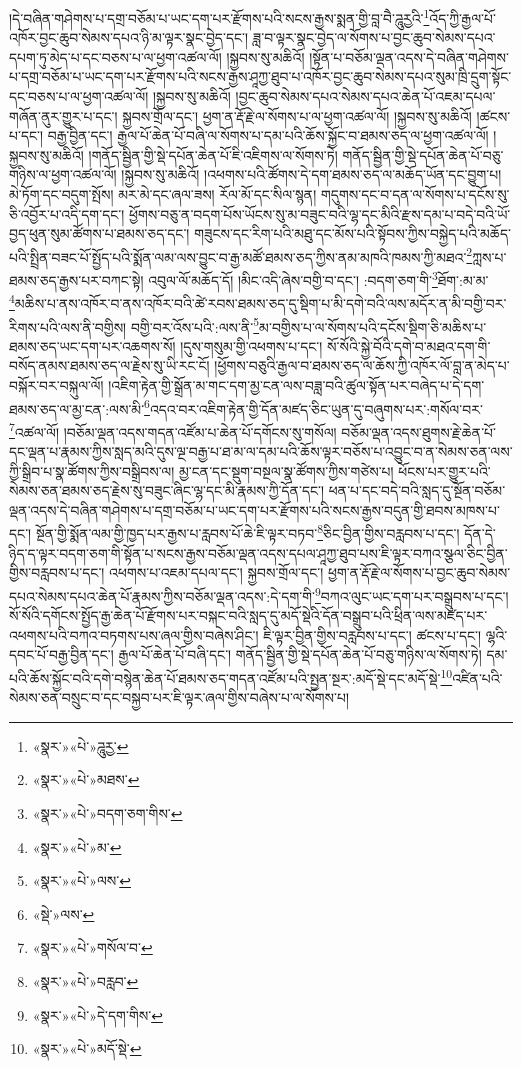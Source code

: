 །དེ་བཞིན་གཤེགས་པ་དགྲ་བཅོམ་པ་ཡང་དག་པར་རྫོགས་པའི་སངས་རྒྱས་སྨན་གྱི་བླ་བཻ་ཌཱུརྱའི་\footnote{«སྣར་»«པེ་»ཌཱུརྱ་}འོད་ཀྱི་རྒྱལ་པོ་འཁོར་བྱང་ཆུབ་སེམས་དཔའ་ཉི་མ་ལྟར་སྣང་བྱེད་དང་། ཟླ་བ་ལྟར་སྣང་བྱེད་ལ་སོགས་པ་བྱང་ཆུབ་སེམས་དཔའ་དཔག་ཏུ་མེད་པ་དང་བཅས་པ་ལ་ཕྱག་འཚལ་ལོ། །སྐྱབས་སུ་མཆིའོ། །སྟོན་པ་བཅོམ་ལྡན་འདས་དེ་བཞིན་གཤེགས་པ་དགྲ་བཅོམ་པ་ཡང་དག་པར་རྫོགས་པའི་སངས་རྒྱས་ཤཱཀྱ་ཐུབ་པ་འཁོར་བྱང་ཆུབ་སེམས་དཔའ་སུམ་ཁྲི་དྲུག་སྟོང་དང་བཅས་པ་ལ་ཕྱག་འཚལ་ལོ། །སྐྱབས་སུ་མཆིའོ། །བྱང་ཆུབ་སེམས་དཔའ་སེམས་དཔའ་ཆེན་པོ་འཇམ་དཔལ་གཞོན་ནུར་གྱུར་པ་དང་། སྐྱབས་གྲོལ་དང་། ཕྱག་ན་རྡོ་རྗེ་ལ་སོགས་པ་ལ་ཕྱག་འཚལ་ལོ། །སྐྱབས་སུ་མཆིའོ། །ཚངས་པ་དང་། བརྒྱ་བྱིན་དང་། རྒྱལ་པོ་ཆེན་པོ་བཞི་ལ་སོགས་པ་དམ་པའི་ཆོས་སྐྱོང་བ་ཐམས་ཅད་ལ་ཕྱག་འཚལ་ལོ། །སྐྱབས་སུ་མཆིའོ། །གནོད་སྦྱིན་གྱི་སྡེ་དཔོན་ཆེན་པོ་ཇི་འཇིགས་ལ་སོགས་ཏེ། གནོད་སྦྱིན་གྱི་སྡེ་དཔོན་ཆེན་པོ་བཅུ་གཉིས་ལ་ཕྱག་འཚལ་ལོ། །སྐྱབས་སུ་མཆིའོ། །འཕགས་པའི་ཚོགས་དེ་དག་ཐམས་ཅད་ལ་མཆོད་ཡོན་དང་བྱུག་པ། མེ་ཏོག་དང་བདུག་སྤོས། མར་མེ་དང་ཞལ་ཟས། རོལ་མོ་དང་སིལ་སྙན། གདུགས་དང་བ་དན་ལ་སོགས་པ་དངོས་སུ་ཅི་འབྱོར་པ་འདི་དག་དང་། ཕྱོགས་བཅུ་ན་བདག་པོས་ཡོངས་སུ་མ་བཟུང་བའི་ལྷ་དང་མིའི་རྫས་དམ་པ་བདེ་བའི་ཡོ་བྱད་ཕུན་སུམ་ཚོགས་པ་ཐམས་ཅད་དང་། གཟུངས་དང་རིག་པའི་མཐུ་དང་མོས་པའི་སྟོབས་ཀྱིས་བསྐྱེད་པའི་མཆོད་པའི་སྤྲིན་བཟང་པོ་སྤྱོད་པའི་སྨོན་ལམ་ལས་བྱུང་བ་རྒྱ་མཚོ་ཐམས་ཅད་ཀྱིས་ནམ་མཁའི་ཁམས་ཀྱི་མཐའ་\footnote{«སྣར་»«པེ་»མཐས་}ཀླས་པ་ཐམས་ཅད་རྒྱས་པར་བཀང་སྟེ། འབུལ་ལོ་མཆོད་དོ། །མིང་འདི་ཞེས་བགྱི་བ་དང་། :བདག་ཅག་གི་\footnote{«སྣར་»«པེ་»བདག་ཅག་གིས་}ཐོག་:མ་མ་\footnote{«སྣར་»«པེ་»མ་}མཆིས་པ་ནས་འཁོར་བ་ནས་འཁོར་བའི་ཚེ་རབས་ཐམས་ཅད་དུ་སྡིག་པ་མི་དགེ་བའི་ལས་མདོར་ན་མི་བགྱི་བར་རིགས་པའི་ལས་ནི་བགྱིས། བགྱི་བར་འོས་པའི་:ལས་ནི་\footnote{«སྣར་»«པེ་»ལས་}མ་བགྱིས་པ་ལ་སོགས་པའི་དངོས་སྡིག་ཅི་མཆིས་པ་ཐམས་ཅད་ཡང་དག་པར་འཆགས་སོ། །དུས་གསུམ་གྱི་འཕགས་པ་དང་། སོ་སོའི་སྐྱེ་བོའི་དགེ་བ་མཐའ་དག་གི་བསོད་ནམས་ཐམས་ཅད་ལ་རྗེས་སུ་ཡི་རང་ངོ། །ཕྱོགས་བཅུའི་རྒྱལ་བ་ཐམས་ཅད་ལ་ཆོས་ཀྱི་འཁོར་ལོ་བླ་ན་མེད་པ་བསྐོར་བར་བསྐུལ་ལོ། །འཇིག་རྟེན་གྱི་སྒྲོན་མ་གང་དག་མྱ་ངན་ལས་བཟླ་བའི་ཚུལ་སྟོན་པར་བཞེད་པ་དེ་དག་ཐམས་ཅད་ལ་མྱ་ངན་:ལས་མི་\footnote{«སྡེ་»ལས་}འདའ་བར་འཇིག་རྟེན་གྱི་དོན་མཛད་ཅིང་ཡུན་དུ་བཞུགས་པར་:གསོལ་བར་\footnote{«སྣར་»«པེ་»གསོལ་བ་}འཚལ་ལོ། །བཅོམ་ལྡན་འདས་གདན་འཛོམ་པ་ཆེན་པོ་དགོངས་སུ་གསོལ། བཅོམ་ལྡན་འདས་ཐུགས་རྗེ་ཆེན་པོ་དང་ལྡན་པ་རྣམས་ཀྱིས་སླད་མའི་དུས་ལྔ་བརྒྱ་པ་ཐ་མ་ལ་དམ་པའི་ཆོས་ལྟར་བཅོས་པ་འབྱུང་བ་ན་སེམས་ཅན་ལས་ཀྱི་སྒྲིབ་པ་སྣ་ཚོགས་ཀྱིས་བསྒྲིབས་ལ། མྱ་ངན་དང་སྡུག་བསྔལ་སྣ་ཚོགས་ཀྱིས་གཙེས་པ། ཕོངས་པར་གྱུར་པའི་སེམས་ཅན་ཐམས་ཅད་རྗེས་སུ་བཟུང་ཞིང་ལྷ་དང་མི་རྣམས་ཀྱི་དོན་དང་། ཕན་པ་དང་བདེ་བའི་སླད་དུ་སྔོན་བཅོམ་ལྡན་འདས་དེ་བཞིན་གཤེགས་པ་དགྲ་བཅོམ་པ་ཡང་དག་པར་རྫོགས་པའི་སངས་རྒྱས་བདུན་གྱི་ཐབས་མཁས་པ་དང་། སྔོན་གྱི་སྨོན་ལམ་གྱི་ཁྱད་པར་རྒྱས་པ་རླབས་པོ་ཆེ་ཇི་ལྟར་བཏབ་\footnote{«སྣར་»«པེ་»བརླབ་}ཅིང་བྱིན་གྱིས་བརླབས་པ་དང་། དོན་དེ་ཉིད་ད་ལྟར་བདག་ཅག་གི་སྟོན་པ་སངས་རྒྱས་བཅོམ་ལྡན་འདས་དཔལ་ཤཱཀྱ་ཐུབ་པས་ཇི་ལྟར་བཀའ་སྩལ་ཅིང་བྱིན་གྱིས་བརླབས་པ་དང་། འཕགས་པ་འཇམ་དཔལ་དང་། སྐྱབས་གྲོལ་དང་། ཕྱག་ན་རྡོ་རྗེ་ལ་སོགས་པ་བྱང་ཆུབ་སེམས་དཔའ་སེམས་དཔའ་ཆེན་པོ་རྣམས་ཀྱིས་བཅོམ་ལྡན་འདས་:དེ་དག་གི་\footnote{«སྣར་»«པེ་»དེ་དག་གིས་}བཀའ་ལུང་ཡང་དག་པར་བསྒྲུབས་པ་དང་། སོ་སོའི་དགོངས་སྤྱོད་རྒྱ་ཆེན་པོ་རྫོགས་པར་བསྐང་བའི་སླད་དུ་མདོ་སྡེའི་དོན་བསྒྲུབ་པའི་ཕྲིན་ལས་མཛད་པར་འཕགས་པའི་བཀའ་བཏགས་པས་ཞལ་གྱིས་བཞེས་ཤིང་། ཇི་ལྟར་བྱིན་གྱིས་བརླབས་པ་དང་། ཚངས་པ་དང་། ལྷའི་དབང་པོ་བརྒྱ་བྱིན་དང་། རྒྱལ་པོ་ཆེན་པོ་བཞི་དང་། གནོད་སྦྱིན་གྱི་སྡེ་དཔོན་ཆེན་པོ་བཅུ་གཉིས་ལ་སོགས་ཏེ། དམ་པའི་ཆོས་སྐྱོང་བའི་དགེ་བསྙེན་ཆེན་པོ་ཐམས་ཅད་གདན་འཛོམ་པའི་སྤྱན་སྔར་:མདོ་སྡེ་དང་མདོ་སྡེ་\footnote{«སྣར་»«པེ་»མདོ་སྡེ་}འཛིན་པའི་སེམས་ཅན་བསྲུང་བ་དང་བསྐྱབ་པར་ཇི་ལྟར་ཞལ་གྱིས་བཞེས་པ་ལ་སོགས་པ། 